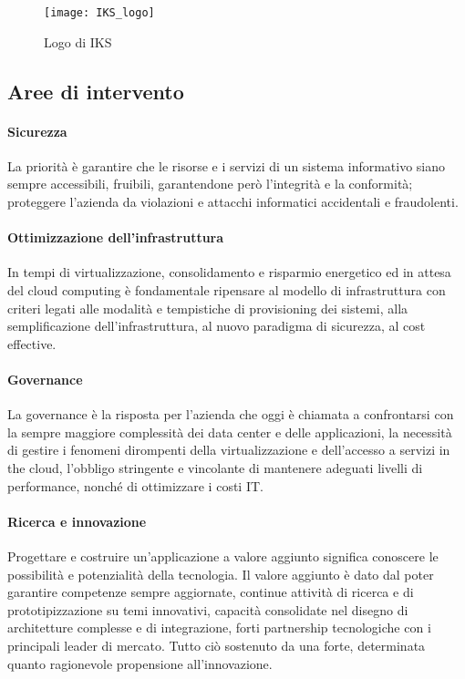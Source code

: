 \begin{figure}[H] 
    \centering 
    \texttt{[image: IKS\_logo]} 
    \caption{Logo di IKS}
\end{figure}

\subsection{Aree di intervento}
\paragraph{Sicurezza}
La priorità è garantire che le risorse e i servizi di un sistema informativo siano sempre accessibili, fruibili, garantendone però l’integrità e la conformità; proteggere l’azienda da violazioni e attacchi informatici accidentali e fraudolenti.

\paragraph{Ottimizzazione dell'infrastruttura}
In tempi di virtualizzazione, consolidamento e risparmio energetico ed in attesa del cloud computing è fondamentale ripensare al modello di infrastruttura con criteri legati alle modalità e tempistiche di provisioning dei sistemi, alla semplificazione dell’infrastruttura, al nuovo paradigma di sicurezza, al cost effective.

\paragraph{Governance}
La \gls{governance} è la risposta per l’azienda che oggi è chiamata a confrontarsi con la sempre maggiore complessità dei data center e delle applicazioni, la necessità di gestire i fenomeni dirompenti della virtualizzazione e dell’accesso a servizi in the cloud, l’obbligo stringente e vincolante di mantenere adeguati livelli di performance, nonché di ottimizzare i costi IT.

\paragraph{Ricerca e innovazione}
Progettare e costruire un’applicazione a valore aggiunto significa conoscere le possibilità e potenzialità della tecnologia. Il valore aggiunto è dato dal poter garantire competenze sempre aggiornate, continue attività di ricerca e di prototipizzazione su temi innovativi, capacità consolidate nel disegno di architetture complesse e di integrazione, forti partnership tecnologiche con i principali leader di mercato. Tutto ciò sostenuto da una forte, determinata quanto ragionevole propensione all’innovazione.

